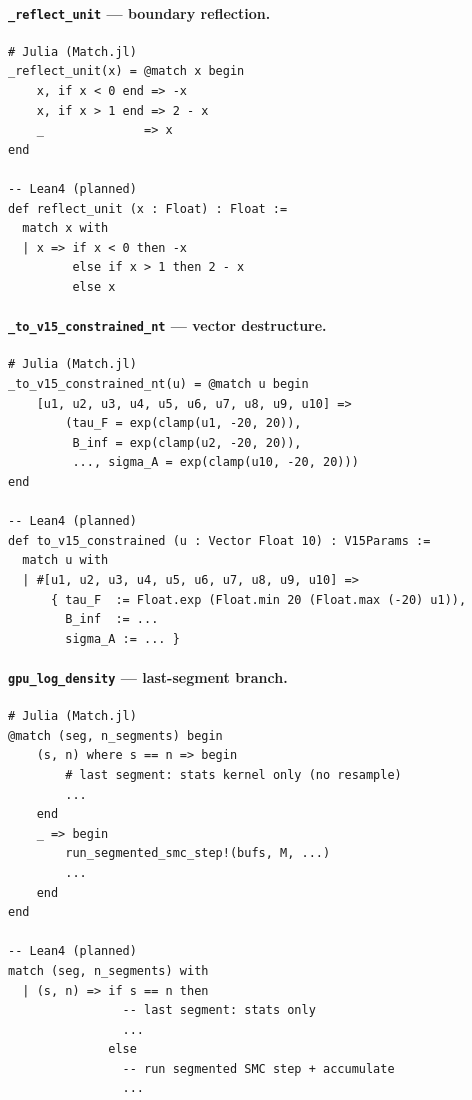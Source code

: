 \documentclass[11pt,a4paper]{article}
\begin{document}
\paragraph{\texttt{\_reflect\_unit} — boundary reflection.}

\begin{lstlisting}
# Julia (Match.jl)
_reflect_unit(x) = @match x begin
    x, if x < 0 end => -x
    x, if x > 1 end => 2 - x
    _              => x
end

-- Lean4 (planned)
def reflect_unit (x : Float) : Float :=
  match x with
  | x => if x < 0 then -x
         else if x > 1 then 2 - x
         else x
\end{lstlisting}

\paragraph{\texttt{\_to\_v15\_constrained\_nt} — vector destructure.}

\begin{lstlisting}
# Julia (Match.jl)
_to_v15_constrained_nt(u) = @match u begin
    [u1, u2, u3, u4, u5, u6, u7, u8, u9, u10] =>
        (tau_F = exp(clamp(u1, -20, 20)),
         B_inf = exp(clamp(u2, -20, 20)),
         ..., sigma_A = exp(clamp(u10, -20, 20)))
end

-- Lean4 (planned)
def to_v15_constrained (u : Vector Float 10) : V15Params :=
  match u with
  | #[u1, u2, u3, u4, u5, u6, u7, u8, u9, u10] =>
      { tau_F  := Float.exp (Float.min 20 (Float.max (-20) u1)),
        B_inf  := ...
        sigma_A := ... }
\end{lstlisting}

\paragraph{\texttt{gpu\_log\_density} — last-segment branch.}

\begin{lstlisting}
# Julia (Match.jl)
@match (seg, n_segments) begin
    (s, n) where s == n => begin
        # last segment: stats kernel only (no resample)
        ...
    end
    _ => begin
        run_segmented_smc_step!(bufs, M, ...)
        ...
    end
end

-- Lean4 (planned)
match (seg, n_segments) with
  | (s, n) => if s == n then
                -- last segment: stats only
                ...
              else
                -- run segmented SMC step + accumulate
                ...
\end{lstlisting}
\end{document}
